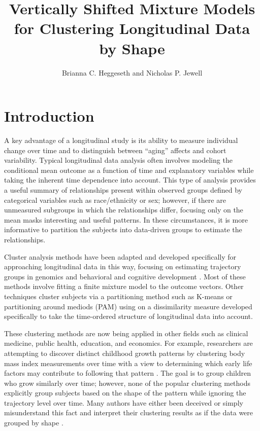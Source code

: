\documentclass[12pt]{article}
\title{Vertically Shifted Mixture Models for Clustering Longitudinal Data by Shape}
\author{Brianna C. Heggeseth and Nicholas P. Jewell}
\begin{document}
\section{Introduction}
A key advantage of a longitudinal study is its ability to measure individual change over time and to distinguish between ``aging'' affects and cohort variability. Typical longitudinal data analysis often involves modeling the conditional mean outcome as a function of time and explanatory variables while taking the inherent time dependence into account. This type of analysis provides a useful summary of relationships present within observed groups defined by categorical variables such as race/ethnicity or sex; however, if there are unmeasured subgroups in which the relationships differ, focusing only on the mean masks interesting and useful patterns. In these circumstances, it is more informative to partition the subjects into data-driven groups to estimate the relationships.

Cluster analysis methods have been adapted and developed specifically for approaching longitudinal data in this way, focusing on estimating trajectory groups in genomics and behavioral and cognitive development \cite{genolini2010, jones2001, muthen2010, mcnicholas2010}. Most of these methods involve fitting a finite mixture model to the outcome vectors. Other techniques cluster subjects via a partitioning method such as K-means \cite{macqueen1967,hartigan1979} or partitioning around mediods (PAM) \cite{kaufman1990} using on a dissimilarity measure developed specifically to take the time-ordered structure of longitudinal data into account.

These clustering methods are now being applied in other fields such as clinical medicine, public health, education, and economics. For example, researchers are attempting to discover distinct childhood growth patterns by clustering body mass index measurements over time with a view to determining which early life factors may contribute to following that pattern \cite{pryor2011,carter2012}. The goal is to group children who grow similarly over time; however, none of the popular clustering methods explicitly group subjects based on the shape of the pattern while ignoring the trajectory level over time. Many authors have either been deceived or simply misunderstand this fact and interpret their clustering results as if the data were grouped by shape \cite{pryor2011,carter2012,nagin1999}. 
\end{document}
